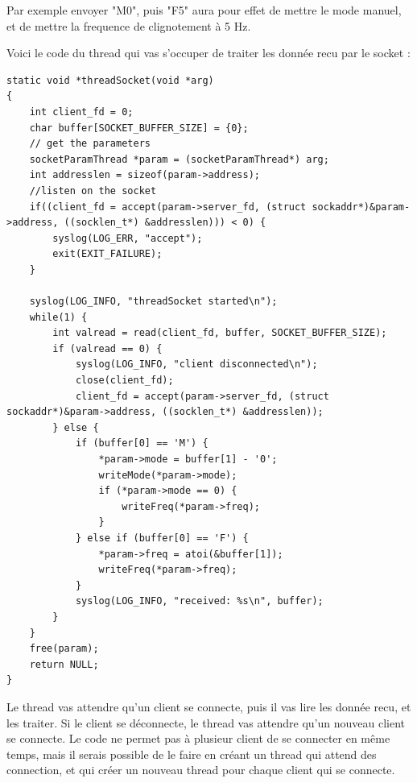 \documentclass[
	a4paper, %
	10pt, %
]{CSUniSchoolLabReport}
\begin{document}
Par exemple envoyer "M0", puis "F5" aura pour effet de mettre le mode manuel, et de mettre la frequence de clignotement à 5 Hz.

Voici le code du thread qui vas s'occuper de traiter les donnée recu par le socket : \\
\begin{lstlisting}[style=CStyle]
static void *threadSocket(void *arg)
{
	int client_fd = 0;
	char buffer[SOCKET_BUFFER_SIZE] = {0};
	// get the parameters
	socketParamThread *param = (socketParamThread*) arg;
	int addresslen = sizeof(param->address);
	//listen on the socket
	if((client_fd = accept(param->server_fd, (struct sockaddr*)&param->address, ((socklen_t*) &addresslen))) < 0) {
		syslog(LOG_ERR, "accept");
		exit(EXIT_FAILURE);
	}

	syslog(LOG_INFO, "threadSocket started\n");
	while(1) {
		int valread = read(client_fd, buffer, SOCKET_BUFFER_SIZE);
		if (valread == 0) {
			syslog(LOG_INFO, "client disconnected\n");
			close(client_fd);
			client_fd = accept(param->server_fd, (struct sockaddr*)&param->address, ((socklen_t*) &addresslen));
		} else {
			if (buffer[0] == 'M') {
				*param->mode = buffer[1] - '0';
				writeMode(*param->mode);
				if (*param->mode == 0) {
					writeFreq(*param->freq);
				}
			} else if (buffer[0] == 'F') {
				*param->freq = atoi(&buffer[1]);
				writeFreq(*param->freq);
			}
			syslog(LOG_INFO, "received: %s\n", buffer);
		}
	}
	free(param);
	return NULL;
}
\end{lstlisting}
Le thread vas attendre qu'un client se connecte, puis il vas lire les donnée recu, et les traiter.
Si le client se déconnecte, le thread vas attendre qu'un nouveau client se connecte.
Le code ne permet pas à plusieur client de se connecter en même temps, mais il serais possible de le faire en créant un thread qui attend des connection, et qui créer un nouveau thread pour chaque client qui se connecte. \\
\end{document}
